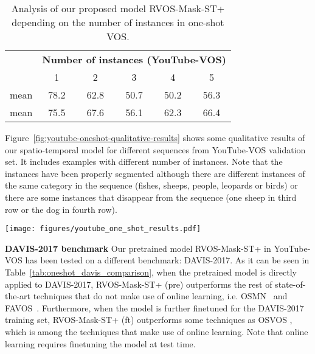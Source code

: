 \documentclass[10pt,twocolumn,letterpaper]{article}
\begin{document}
\begin{table}[]
    \centering
    \begin{tabular}{lccccc}
\toprule
\multicolumn{1}{c}{}  &  \multicolumn{5}{c}{\textbf{Number of instances (YouTube-VOS)}} \\
& 1 & 2 & 3 & 4 & 5 \\
\midrule
 mean & 78.2 & 62.8 & 50.7 & 50.2 & 56.3 \\
 mean & 75.5 & 67.6 & 56.1 & 62.3 & 66.4 \\
\bottomrule
    \end{tabular}
    \caption{Analysis of our proposed model RVOS-Mask-ST+ depending on the number of instances in one-shot VOS.}
    \vspace{-3mm}

    \label{tab:num-instances-analysis}
\end{table}

Figure~\ref{fig:youtube-oneshot-qualitative-results} shows some qualitative results of our spatio-temporal model for different sequences from YouTube-VOS validation set. It includes examples with different number of instances. Note that the instances have been properly segmented although there are different instances of the same category in the sequence (fishes, sheeps, people, leopards or birds) or there are some instances that disappear from the sequence (one sheep in third row or the dog in fourth row). 

\begin{figure*}
    \centering
    \texttt{[image: figures/youtube\_one\_shot\_results.pdf]}
    \caption{Qualitative results for one-shot video object segmentation on YouTube-VOS with multiple instances.}
\label{fig:youtube-oneshot-qualitative-results}
\end{figure*}

\textbf{DAVIS-2017 benchmark} Our pretrained model RVOS-Mask-ST+ in YouTube-VOS has been tested on a different benchmark: DAVIS-2017. As it can be seen in Table~\ref{tab:oneshot_davis_comparison}, when the pretrained model is directly applied to DAVIS-2017, RVOS-Mask-ST+ (pre) outperforms the rest of state-of-the-art techniques that do not make use of online learning, i.e. OSMN~\cite{yang2018efficient} and FAVOS~\cite{Cheng_favos_2018}. Furthermore, when the model is further finetuned for the DAVIS-2017 training set, RVOS-Mask-ST+ (ft) outperforms some techniques as OSVOS \cite{caelles2017one}, which is among the techniques that make use of online learning. Note that online learning requires finetuning the model at test time.
\end{document}
